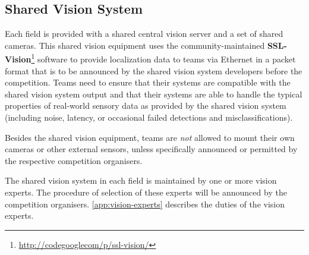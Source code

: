 \subsection{Shared Vision System}
Each field is provided with a shared central vision server and a set of shared cameras.
This shared vision equipment uses the community-maintained \textbf{SSL-Vision}\footnote{\url{http://codegooglecom/p/ssl-vision/}} software to provide localization data to teams via Ethernet in a packet format that is to be announced by the shared vision system developers before the competition.
Teams need to ensure that their systems are compatible with the shared vision system output and that their systems are able to handle the typical properties of real-world sensory data as provided by the shared vision system (including noise, latency, or occasional failed detections and misclassifications).

Besides the shared vision equipment, teams are \emph{not} allowed to mount their own cameras or other external sensors, unless specifically announced or permitted by the respective competition organisers.

The shared vision system in each field is maintained by one or more vision experts.
The procedure of selection of these experts will be announced by the competition organisers.
\autoref{app:vision-experts} describes the duties of the vision experts.

